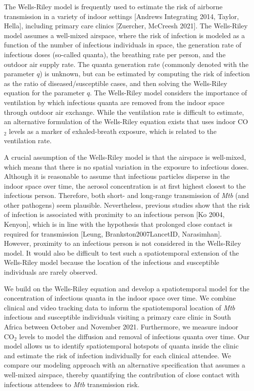 \documentclass[fleqn,11pt]{wlscirep}
\begin{document}
The Wells-Riley model\cite{Riley1978AJE} is frequently used to estimate the risk of airborne transmission in a variety of indoor settings [Andrews Integrating 2014, Taylor, Hella], including primary care clinics [Zuercher, McCreesh 2021]. The Wells-Riley model assumes a well-mixed airspace, where the risk of infection is modeled as a function of the number of infectious individuals in space, the generation rate of infectious doses (so-called quanta), the breathing rate per person, and the outdoor air supply rate. The quanta generation rate (commonly denoted with the parameter $q$) is unknown, but can be estimated by computing the risk of infection as the ratio of diseased/susceptible cases, and then solving the Wells-Riley equation for the parameter $q$\cite{Nardell1991ARRD,Escombe2008PLoSMed}. The Wells-Riley model considers the importance of ventilation by which infectious quanta are removed from the indoor space through outdoor air exchange. While the ventilation rate is difficult to estimate, an alternative formulation of the Wells-Riley equation exists that uses indoor CO$_2$ levels as a marker of exhaled-breath exposure\cite{Rudnick2003IndoorAir}, which is related to the ventilation rate. 

A crucial assumption of the Wells-Riley model is that the airspace is well-mixed, which means that there is no spatial variation in the exposure to infectious doses. Although it is reasonable to assume that infectious particles disperse in the indoor space over time, the aerosol concentration is at first highest closest to the infectious person\cite{Vuorinen2020SafSci,Chen2020BuildEnv}. Therefore, both short- and long-range transmission of \emph{Mtb} (and other pathogens) seem plausible. Nevertheless, previous studies show that the risk of infection is associated with proximity to an infectious person [Ko 2004, Kenyon], which is in line with the hypothesis that prolonged close contact is required for transmission [Leung, Brankston2007LancetID, Narasimhan]. However, proximity to an infectious person is not considered in the Wells-Riley model. It would also be difficult to test such a spatiotemporal extension of the Wells-Riley model because the location of the infectious and susceptible individuals are rarely observed.    

We build on the Wells-Riley equation and develop a spatiotemporal model for the concentration of infectious quanta in the indoor space over time. We combine clinical and video tracking data to inform the spatiotemporal location of \emph{Mtb} infectious and susceptible individuals visiting a primary care clinic in South Africa between October and November 2021. Furthermore, we measure indoor CO$_2$ levels to model the diffusion and removal of infectious quanta over time. Our model allows us to identify spatiotemporal hotspots of quanta inside the clinic and estimate the risk of infection individually for each clinical attendee. We compare our modeling approach with an alternative specification that assumes a well-mixed airspace, thereby quantifying the contribution of close contact with infectious attendees to \emph{Mtb} transmission risk. 
\end{document}

